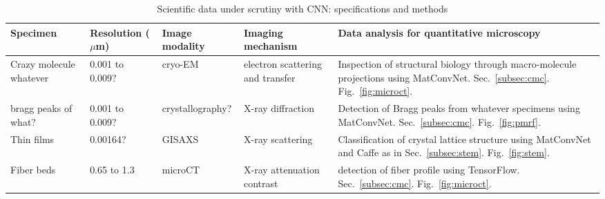 
\begin{table*}[!]
\centering
\caption{Scientific data under scrutiny with CNN: specifications and methods}
\label{table1}
\begin{tabular}{p{2cm}p{1.6cm}p{1.6cm}p{3cm}p{7.5cm}}
\hline
\rowcolor[HTML]{CCE5FF}
Specimen  &  Resolution ($\mu$m)  &  Image \newline modality  &  Imaging  \newline mechanism  &  Data analysis for quantitative microscopy
\\
\hline
\rowcolor[HTML]{FFFFFF} %
Crazy molecule \newline whatever & 0.001 to 0.009? & cryo-EM & electron scattering and transfer & Inspection of structural biology through macro-molecule projections using MatConvNet. Sec.~\ref{subsec:cmc}. Fig.~\ref{fig:microct}.
\\
\hline
\rowcolor[HTML]{F6F6F6} %
bragg peaks of what? & 0.001 to 0.009?  & crystallography? & X-ray diffraction  & Detection of Bragg peaks from whatever specimens using MatConvNet. Sec.~\ref{subsec:cmc}. Fig.~\ref{fig:pmrf}.
\\
\hline
\rowcolor[HTML]{FFFFFF} %
Thin films   & 0.00164?  & GISAXS  & X-ray scattering & Classification of crystal lattice structure using MatConvNet and Caffe as in Sec.~\ref{subsec:stem}. Fig.~\ref{fig:stem}.
\\
\hline
\rowcolor[HTML]{F6F6F6} %
Fiber beds & 0.65 to 1.3 & microCT  & X-ray attenuation contrast & detection of fiber profile using TensorFlow. Sec.~\ref{subsec:cmc}. Fig.~\ref{fig:microct}.
\\
\hline
\end{tabular}
\end{table*}
